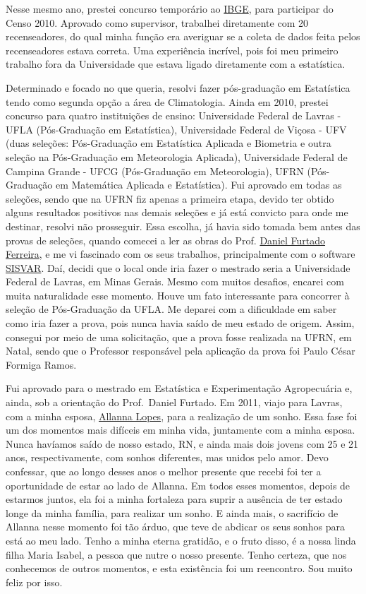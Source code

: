 \documentclass[
]{article}
\begin{document}
Nesse mesmo ano, prestei concurso temporário ao
\href{https://www.ibge.gov.br/}{IBGE}, para participar do Censo 2010.
Aprovado como supervisor, trabalhei diretamente com 20 recenseadores, do
qual minha função era averiguar se a coleta de dados feita pelos
recenseadores estava correta. Uma experiência incrível, pois foi meu
primeiro trabalho fora da Universidade que estava ligado diretamente com
a estatística.

Determinado e focado no que queria, resolvi fazer pós-graduação em
Estatística tendo como segunda opção a área de Climatologia. Ainda em
2010, prestei concurso para quatro instituições de ensino: Universidade
Federal de Lavras - UFLA (Pós-Graduação em Estatística), Universidade
Federal de Viçosa - UFV (duas seleções: Pós-Graduação em Estatística
Aplicada e Biometria e outra seleção na Pós-Graduação em Meteorologia
Aplicada), Universidade Federal de Campina Grande - UFCG (Pós-Graduação
em Meteorologia), UFRN (Pós-Graduação em Matemática Aplicada e
Estatística). Fui aprovado em todas as seleções, sendo que na UFRN fiz
apenas a primeira etapa, devido ter obtido alguns resultados positivos
nas demais seleções e já está convicto para onde me destinar, resolvi
não prosseguir. Essa escolha, já havia sido tomada bem antes das provas
de seleções, quando comecei a ler as obras do Prof.
\href{https://des.ufla.br/~danielff/}{Daniel Furtado Ferreira}, e me vi
fascinado com os seus trabalhos, principalmente com o software
\href{https://des.ufla.br/~danielff/programas/sisvar.html}{SISVAR}. Daí,
decidi que o local onde iria fazer o mestrado seria a Universidade
Federal de Lavras, em Minas Gerais. Mesmo com muitos desafios, encarei
com muita naturalidade esse momento. Houve um fato interessante para
concorrer à seleção de Pós-Graduação da UFLA. Me deparei com a
dificuldade em saber como iria fazer a prova, pois nunca havia saído de
meu estado de origem. Assim, consegui por meio de uma solicitação, que a
prova fosse realizada na UFRN, em Natal, sendo que o Professor
responsável pela aplicação da prova foi Paulo César Formiga Ramos.

Fui aprovado para o mestrado em Estatística e Experimentação
Agropecuária e, ainda, sob a orientação do Prof.~Daniel Furtado. Em
2011, viajo para Lavras, com a minha esposa,
\href{https://www.instagram.com/allannadvl/}{Allanna Lopes}, para a
realização de um sonho. Essa fase foi um dos momentos mais difíceis em
minha vida, juntamente com a minha esposa. Nunca havíamos saído de nosso
estado, RN, e ainda mais dois jovens com 25 e 21 anos, respectivamente,
com sonhos diferentes, mas unidos pelo amor. Devo confessar, que ao
longo desses anos o melhor presente que recebi foi ter a oportunidade de
estar ao lado de Allanna. Em todos esses momentos, depois de estarmos
juntos, ela foi a minha fortaleza para suprir a ausência de ter estado
longe da minha família, para realizar um sonho. E ainda mais, o
sacrifício de Allanna nesse momento foi tão árduo, que teve de abdicar
os seus sonhos para está ao meu lado. Tenho a minha eterna gratidão, e o
fruto disso, é a nossa linda filha Maria Isabel, a pessoa que nutre o
nosso presente. Tenho certeza, que nos conhecemos de outros momentos, e
esta existência foi um reencontro. Sou muito feliz por isso.
\end{document}
